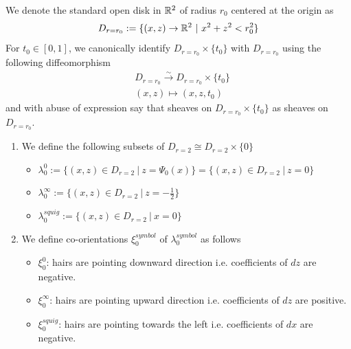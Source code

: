 \begin{definition}
We denote the standard open disk in $\mathbb{R}^2$ of radius $r_0$ centered at the origin as 
\[
D_{r=r_0} := \{(x,z)\rightarrow \mathbb{R}^2 ~|~ x^2+z^2 < r_0^2\}
\]
For $t_0 \in [0,1]$, we canonically identify $D_{r=r_0}\times \{t_0\}$ with $D_{r=r_0}$ using the following diffeomorphism
\begin{align*}
& D_{r=r_0} \xrightarrow{\sim} D_{r=r_0} \times \{t_0\} \\
& (x,z) \mapsto (x,z,t_0)
\end{align*}
and with abuse of expression say that sheaves on $D_{r=r_0}\times \{t_0\}$ as sheaves on $D_{r=r_0}$.
\end{definition}

\begin{definition}
\begin{enumerate}
\item We define the following subsets of $D_{r=2} \cong D_{r=2}\times \{0\}$
\begin{itemize}
\item $\lambda_0^0 := \{(x,z) \in D_{r=2} ~|~ z = \Psi_0(x)\}=\{(x,z) \in D_{r=2} ~|~ z = 0\}$

\item $\lambda_0^\infty:=\{(x,z) \in D_{r=2} ~|~ z= -\frac{1}{2}\}$

\item $\lambda_0^{squig}:=\{(x,z) \in D_{r=2} ~|~ x= 0\}$
\end{itemize}

\item We define co-orientations $\xi_0^{symbol}$ of $\lambda_0^{symbol}$ as follows
\begin{itemize}
\item $\xi_0^0$: hairs are pointing downward direction i.e. coefficients of $dz$ are negative.

\item $\xi_0^\infty$: hairs are pointing upward direction i.e. coefficients of $dz$ are positive.

\item $\xi_0^{squig}$: hairs are pointing towards the left i.e. coefficients of $dx$ are negative.
\end{itemize}
\end{enumerate}
\end{definition}

